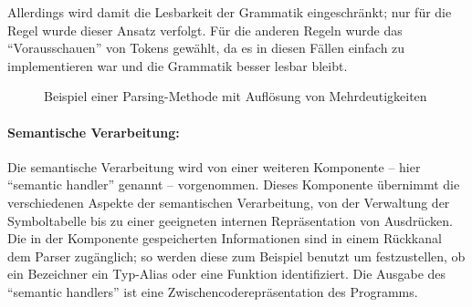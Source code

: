 \documentclass[twoside,a4paper,fleqn,12pt]{book}
\begin{document}
Allerdings wird damit die Lesbarkeit der Grammatik eingeschränkt; nur für die Regel  wurde dieser Ansatz verfolgt.
Für die anderen Regeln wurde das "`Vorausschauen"' von Tokens gewählt, da es in diesen Fällen einfach zu implementieren war
und die Grammatik besser lesbar bleibt.

\begin{figure}[!h]
   \centering
  
  \caption{Beispiel einer Parsing-Methode mit Auflösung von Mehrdeutigkeiten}
  \label{fig:ParseProgramStatements}
\end{figure}

\paragraph{Semantische Verarbeitung:}
Die semantische Verarbeitung wird von einer weiteren Komponente -- hier ``semantic handler'' genannt -- vorgenommen. 
Dieses Komponente übernimmt die verschiedenen Aspekte der semantischen Verarbeitung, von der Verwaltung der
Symboltabelle bis zu einer geeigneten internen Repräsentation von Ausdrücken. Die in der Komponente gespeicherten Informationen sind
in einem Rückkanal dem Parser zugänglich; so werden diese zum Beispiel benutzt um festzustellen, ob ein Bezeichner ein
Typ-Alias oder eine Funktion identifiziert.
Die Ausgabe des ``semantic handlers'' ist eine Zwischencoderepräsentation des Programms.


\end{document}
